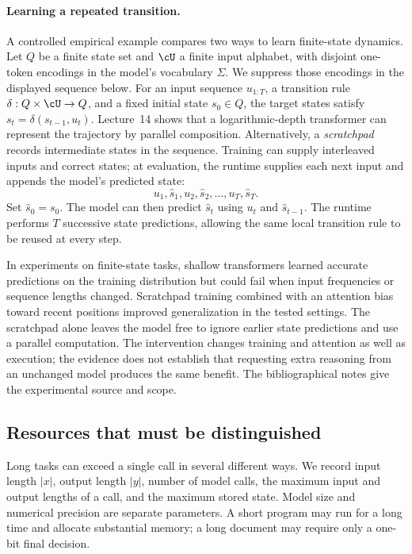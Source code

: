 \documentclass[11pt,twoside]{article}
\theoremstyle{definition}
\theoremstyle{remark}
\begin{document}
\paragraph{Learning a repeated transition.}
A controlled empirical example compares two ways to learn finite-state
dynamics. Let \(Q\) be a finite state set and \(\cU\) a finite input alphabet,
with disjoint one-token encodings in the model's vocabulary \(\Sigma\).
We suppress those encodings in the displayed sequence below.
For an input sequence \(u_{1:T}\), a transition rule
\(\delta:Q\times\cU\to Q\), and a fixed initial state \(s_0\in Q\), the
target states satisfy \(s_t=\delta(s_{t-1},u_t)\).
Lecture~14 shows that a logarithmic-depth transformer can represent the trajectory
by parallel composition. Alternatively, a \emph{scratchpad} records
intermediate states in the sequence. Training can supply interleaved inputs
and correct states; at evaluation, the runtime supplies each next input
and appends the model's predicted state:
\[
 u_1,\widehat s_1,u_2,\widehat s_2,\ldots,u_T,\widehat s_T.
\]
Set \(\widehat s_0=s_0\). The model can then predict \(\widehat s_t\)
using \(u_t\) and \(\widehat s_{t-1}\). The runtime performs \(T\) successive
state predictions, allowing the same local transition rule to be reused
at every step.

In experiments on finite-state tasks, shallow transformers learned accurate
predictions on the training distribution but could fail when input
frequencies or sequence lengths changed. Scratchpad training combined with
an attention bias toward recent positions improved generalization in the
tested settings. The scratchpad alone leaves the model free to ignore
earlier state predictions and use a parallel computation.
The intervention changes training and attention as well as execution;
the evidence does not establish that requesting extra reasoning from an
unchanged model produces the same benefit. The bibliographical notes give
the experimental source and scope.

\subsection{Resources that must be distinguished}

Long tasks can exceed a single call in several different ways. We record
input length $|x|$, output length $|y|$, number of model calls, the maximum
input and output lengths of a call, and the maximum stored state. Model
size and numerical precision are separate parameters. A short program may
run for a long time and allocate substantial memory; a long document may
require only a one-bit final decision.
\end{document}
